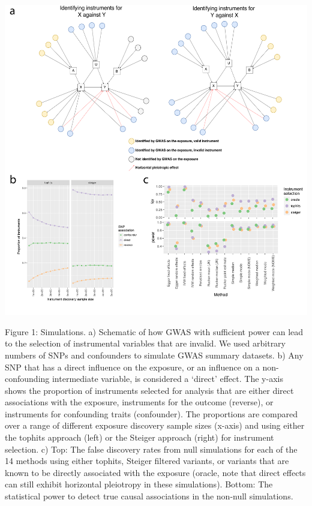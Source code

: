 \documentclass[]{article}
\begin{document}
\includegraphics{images/fig1.pdf}

Figure 1: Simulations. a) Schematic of how GWAS with sufficient power
can lead to the selection of instrumental variables that are invalid. We
used arbitrary numbers of SNPs and confounders to simulate GWAS summary
datasets. b) Any SNP that has a direct influence on the exposure, or an
influence on a non-confounding intermediate variable, is considered a
`direct' effect. The y-axis shows the proportion of instruments selected
for analysis that are either direct associations with the exposure,
instruments for the outcome (reverse), or instruments for confounding
traits (confounder). The proportions are compared over a range of
different exposure discovery sample sizes (x-axis) and using either the
tophits approach (left) or the Steiger approach (right) for instrument
selection. c) Top: The false discovery rates from null simulations for
each of the 14 methods using either tophits, Steiger filtered variants,
or variants that are known to be directly associated with the exposure
(oracle, note that direct effects can still exhibit horizontal
pleiotropy in these simulations). Bottom: The statistical power to
detect true causal associations in the non-null simulations.

\newpage
\end{document}
